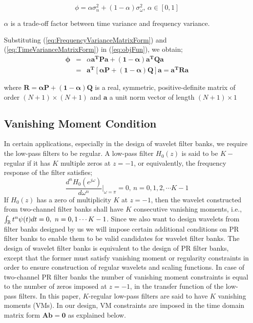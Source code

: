 \begin{equation}
\phi=\alpha\sigma_{n}^{2}+(1-\alpha)\sigma_{\omega}^{2}, \,\alpha\in[0,1]
\label{eq:objFun}
\end{equation}


 $\alpha$ is a trade-off factor between time variance and frequency
variance.

Substituting (\ref {eq:FrequencyVarianceMatrixForm}) and (\ref{eq:TimeVarianceMatrixForm}) in (\ref{eq:objFun}), we obtain;
\begin{eqnarray}
\mathbf{\phi}&=&\alpha\mathbf{a^{T}}\mathbf{P}\mathbf{a+(1-\alpha)a^{T}}\mathbf{Q}\mathbf{a}\nonumber \\
&=& \mathbf{a^{T}[\alpha P+(1-\alpha)Q]a}\mathbf=\mathbf{a^{T}Ra}\label{eq:ObjectiveFunction}
\end{eqnarray}

where $\mathbf{\mathbf{R}=\alpha\mathbf{P}+(1-\alpha)\mathbf{Q}} $ is a real, symmetric, positive-definite matrix of order $(N+1)\times(N+1)$ and $\mathbf{a}$ a unit norm vector of length $(N+1)\times1$
\subsection{\label{sub:Vanishing-Moment-Condition}Vanishing Moment Condition}
In certain applications, especially in the design of wavelet filter
banks, we require the low-pass filters to be regular. A low-pass filter
$H_{0}(z)$ is said to be $K-$regular if it has $K$ multiple zeros
at $z=-1$, or equivalently, the frequency response of the filter
satisfies;
\[ \frac{d^{n}H_{0}(e^{j\omega})}{d\omega^{n}}\Bigg|_{\omega=\pi}=0,\, n=0,1,2,\cdots K-1 \]
If $H_{0}(z)$ has a zero of multiplicity $K$ at $z=-1$, then the
wavelet constructed from two-channel filter banks shall have $K$
consecutive vanishing moments, i.e., $\intop_{\mathbb{R}}t^{n}\psi(t)dt=0,\,\, n=0,1\cdots K-1$.
Since we also want to design wavelets from filter banks designed by
us we will impose certain additional conditions on PR filter banks
to enable them to be valid candidates for wavelet filter banks. The
design of wavelet filter banks is equivalent to the design of PR filter
banks, except that the former must satisfy vanishing moment or regularity
constraints in order to ensure construction of regular wavelets and
scaling functions. In case of two-channel PR filter banks the number of
vanishing moment constraints is equal to the number of zeros imposed
at $z=-1$, in the transfer function of the low-pass filters. In this
paper, $K$-regular low-pass filters are said to have $K$ vanishing moments
(VMs). In our design, VM constraints are imposed in the time domain matrix
form $\mathbf{Ab=0}$ as explained below.

